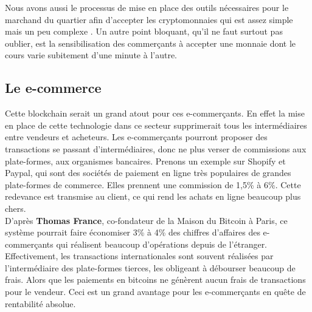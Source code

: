 \documentclass[12pt]{report}
\begin{document}
\hspace{1cm} Nous avons aussi le processus de mise en place des outils nécessaires pour le marchand du quartier afin d'accepter les cryptomonnaies qui est assez simple mais un peu complexe . Un autre point bloquant, qu'il ne faut surtout pas oublier, est la sensibilisation des commerçants à accepter une monnaie dont le cours varie subitement d'une minute à l'autre.\\



    \subsection{Le e-commerce}

\hspace{1cm} Cette blockchain serait un grand atout pour ces e-commerçants. En effet la mise en place de cette technologie dans ce secteur supprimerait tous les intermédiaires entre vendeurs et acheteurs. Les e-commerçants pourront proposer des transactions se passant d'intermédiaires, donc ne plus verser de commissions aux plate-formes, aux organismes bancaires. Prenons un exemple sur Shopify et Paypal, qui sont des sociétés de paiement en ligne très populaires de grandes plate-formes de commerce. Elles prennent une commission de 1,5\% à 6\%. Cette redevance est transmise au client, ce qui rend les achats en ligne beaucoup plus chers.\\

\hspace{1cm} D'après \textbf{Thomas France}, co-fondateur de la Maison du Bitcoin à Paris, ce système pourrait faire économiser 3\% à 4\% des chiffres d'affaires des e-commerçants qui réalisent beaucoup d'opérations depuis de l'étranger. Effectivement, les transactions internationales sont souvent réalisées par l'intermédiaire des plate-formes tierces, les obligeant à débourser beaucoup de frais. Alors que les paiements en bitcoins ne génèrent aucun frais de transactions pour le vendeur. Ceci est un grand avantage pour les e-commerçants en quête de rentabilité absolue.\\
\end{document}
